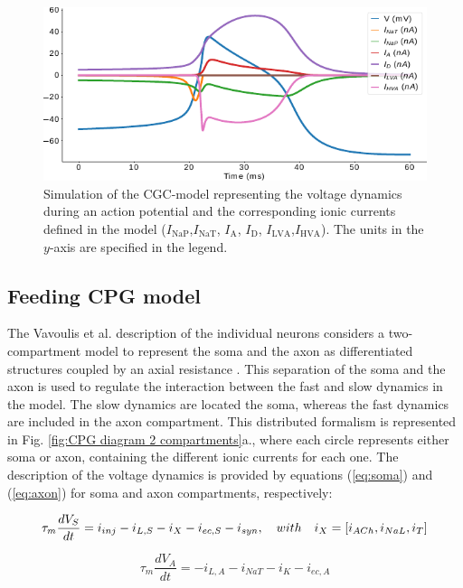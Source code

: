 \begin{figure}[htb!]
	\centering
	\includegraphics[width=\textwidth]{img/laser/cgc-model-simulation.pdf}
	\caption{Simulation of the CGC-model representing the voltage dynamics during an action potential and the corresponding ionic currents defined in the model ($I_{\textrm{NaP}}$,$I_{\textrm{NaT}}$, $I_{\textrm{A}}$, $I_{\textrm{D}}$, $I_{\textrm{LVA}}$,$I_{\textrm{HVA}}$). The units in the $y$-axis are specified in the legend.}
\end{figure}

\subsection{Feeding CPG model}
The Vavoulis et al. description of the individual neurons considers a two-compartment model to represent the soma and the axon as  differentiated structures coupled by an axial resistance \cite{Vavoulis2007}. This separation of the soma and the axon is used to regulate the interaction between the fast and slow dynamics in the model. The slow dynamics are located the soma, whereas the fast dynamics are included in the axon compartment. This distributed formalism is represented in Fig. \ref{fig:CPG diagram 2 compartments}a., where each circle represents either soma or axon, containing the different ionic currents for each one. The description of the voltage dynamics is provided by equations (\ref{eq:soma}) and (\ref{eq:axon}) for soma and axon compartments, respectively: 

\begin{equation}
	\tau_m\frac{dV_S}{dt} = i_{inj} - i_{L,S} - i_X - i_{ec,S} - i_{syn} \\,
	\quad with \quad i_X = [i_{ACh},i_{NaL},i_T]
	\label{eq:soma}
\end{equation}

\begin{equation}
	\tau_m\frac{dV_A}{dt} = -i_{L,A} - i_{NaT} - i_K - i_{ec,A}
	\label{eq:axon}
\end{equation}


